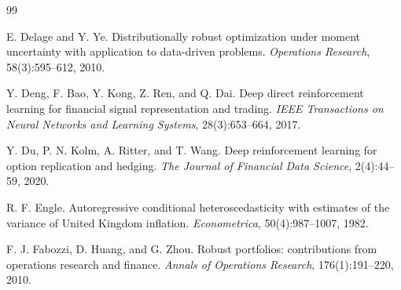 \documentclass[10pt,twocolumn]{article}
\begin{document}
\begin{thebibliography}{99}

E. Delage and Y. Ye.
\newblock Distributionally robust optimization under moment uncertainty with application to data-driven problems.
\newblock \emph{Operations Research}, 58(3):595--612, 2010.


Y. Deng, F. Bao, Y. Kong, Z. Ren, and Q. Dai.
\newblock Deep direct reinforcement learning for financial signal representation
  and trading.
\newblock \emph{IEEE Transactions on Neural Networks and Learning Systems},
  28(3):653--664, 2017.


Y. Du, P. N. Kolm, A. Ritter, and T. Wang.
\newblock Deep reinforcement learning for option replication and hedging.
\newblock \emph{The Journal of Financial Data Science}, 2(4):44--59, 2020.


R. F. Engle.
\newblock Autoregressive conditional heteroscedasticity with estimates of the
  variance of United Kingdom inflation.
\newblock \emph{Econometrica}, 50(4):987--1007, 1982.


F. J. Fabozzi, D. Huang, and G. Zhou.
\newblock Robust portfolios: contributions from operations research and finance.
\newblock \emph{Annals of Operations Research}, 176(1):191--220, 2010.



\end{thebibliography}
\end{document}
